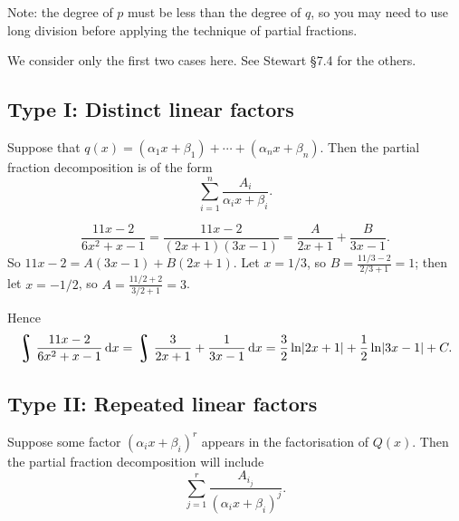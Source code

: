 Note: the degree of $ p $ must be less than the degree of $ q $, so you may need to use long division
before applying the technique of partial fractions.

We consider only the first two cases here. See Stewart \S 7.4 for the others.

\clearpage
\subsection*{Type I: Distinct linear factors}
Suppose that $ q(x) = (\alpha_1 x + \beta_1) + \cdots + (\alpha_n x + \beta_n) $. Then the partial
fraction decomposition is of the form
\begin{displaymath}
  \sum_{i = 1}^n \dfrac{A_i}{\alpha_i x + \beta_i}.
\end{displaymath}

\begin{ex}
  \begin{displaymath}
    \dfrac{11x - 2}{6x^2 + x - 1} = \dfrac{11x - 2}{(2x + 1)(3x - 1)} = \dfrac{A}{2x + 1} + \dfrac{B}{3x - 1}.
  \end{displaymath}
  So $ 11x - 2 = A(3x - 1) + B(2x + 1) $. Let $ x = 1/3 $, so $ B = \frac{11/3 - 2}{2/3 + 1} = 1 $;
  then let $ x = -1/2 $, so $ A = \frac{11/2 + 2}{3/2 + 1} = 3 $.

  Hence
  \begin{displaymath}
    \rint \dfrac{11x - 2}{6x^2 + x - 1} \dif{x} = \rint \dfrac{3}{2x + 1} + \dfrac{1}{3x - 1} \dif{x}
      = \dfrac{3}{2} \ln\abs{2x + 1} + \dfrac{1}{2} \ln\abs{3x - 1} + C.
  \end{displaymath}
\end{ex}

\subsection*{Type II: Repeated linear factors}
Suppose some factor $ (\alpha_i x + \beta_i)^r $ appears in the factorisation of $ Q(x) $. Then
the partial fraction decomposition will include
\begin{displaymath}
  \sum_{j = 1}^{r} \frac{A_{i_j}}{(\alpha_i x + \beta_i)^j}.
\end{displaymath}

